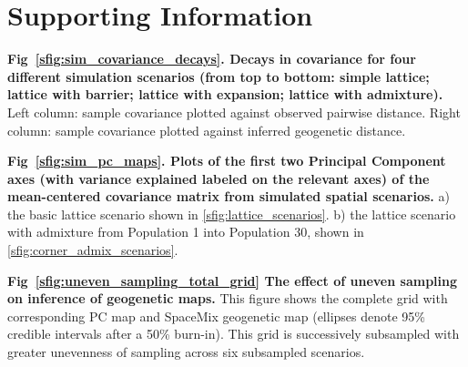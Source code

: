 \documentclass[10pt,letterpaper]{article}
\begin{document}

\clearpage
\newpage

\section*{Supporting Information}


\label{sim_covariance_decays}
{\bf{Fig\ \ref{sfig:sim_covariance_decays}. Decays in covariance for four different simulation scenarios (from top to bottom: simple lattice; lattice with barrier; lattice with expansion; lattice with admixture).} } Left column: sample covariance plotted against observed pairwise distance.  Right column: sample covariance plotted against inferred geogenetic distance.

\label{sim_pc_maps}
{\bf{Fig\ \ref{sfig:sim_pc_maps}. Plots of the first two Principal Component axes (with variance explained labeled on the relevant axes)
			of the mean-centered covariance matrix from simulated spatial scenarios.}}
			a) the basic lattice scenario shown in \ref{sfig:lattice_scenarios}.
			b) the lattice scenario with admixture from Population 1 into Population 30, 
				shown in \ref{sfig:corner_admix_scenarios}.

\label{sfig:uneven_sampling_total_grid}
{\bf{Fig\ \ref{sfig:uneven_sampling_total_grid}}
	The effect of uneven sampling on inference of geogenetic maps.}
	This figure shows the complete grid with corresponding PC map
	and SpaceMix geogenetic map 
	(ellipses denote 95\% credible intervals after a 50\% burn-in).  
	This grid is successively subsampled with greater unevenness of
	sampling across six subsampled scenarios.
	
\end{document}
